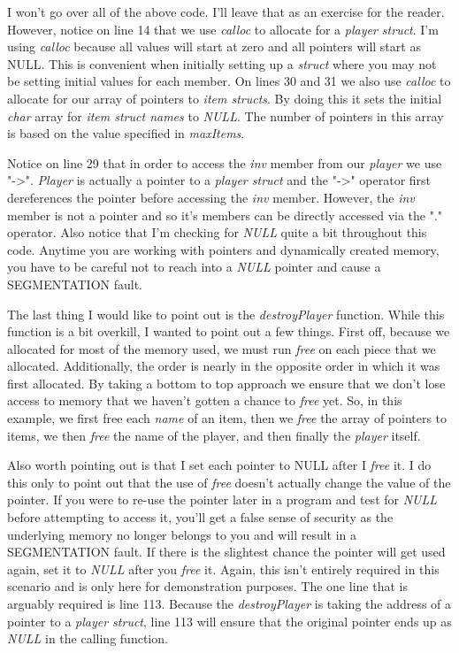 \documentclass[../main.tex]{subfiles}
\begin{document}
	
	
	I won't go over all of the above code.  I'll leave that as an exercise for the reader.  However, notice on line 14 that we use \textit{calloc} to allocate for a \textit{player struct}.  I'm using \textit{calloc} because all values will start at zero and all pointers will start as NULL.  This is convenient when initially setting up a \textit{struct} where you may not be setting initial values for each member.  On lines 30 and 31 we also use \textit{calloc} to allocate for our array of pointers to \textit{item structs}.  By doing this it sets the initial \textit{char} array for \textit{item struct names} to \textit{NULL}.  The number of pointers in this array is based on the value specified in \textit{maxItems}.
	
	Notice on line 29 that in order to access the \textit{inv} member from our \textit{player} we use "->".  \textit{Player} is actually a pointer to a \textit{player struct} and the "->" operator first dereferences the pointer before accessing the \textit{inv} member.  However, the \textit{inv} member is not a pointer and so it's members can be directly accessed via the "." operator.  Also notice that I'm checking for \textit{NULL} quite a bit throughout this code.  Anytime you are working with pointers and dynamically created memory, you have to be careful not to reach into a \textit{NULL} pointer and cause a SEGMENTATION fault.
	
	The last thing I would like to point out is the \textit{destroyPlayer} function.  While this function is a bit overkill, I wanted to point out a few things.  First off, because we allocated for most of the memory used, we must run \textit{free} on each piece that we allocated.  Additionally, the order is nearly in the opposite order in which it was first allocated.  By taking a bottom to top approach we ensure that we don't lose access to memory that we haven't gotten a chance to \textit{free} yet.  So, in this example, we first free each \textit{name} of an item, then we \textit{free} the array of pointers to items, we then \textit{free} the name of the player, and then finally the \textit{player} itself.  
	
	Also worth pointing out is that I set each pointer to NULL after I \textit{free} it.  I do this only to point out that the use of \textit{free} doesn't actually change the value of the pointer.  If you were to re-use the pointer later in a program and test for \textit{NULL} before attempting to access it, you'll get a false sense of security as the underlying memory no longer belongs to you and will result in a SEGMENTATION fault.  If there is the slightest chance the pointer will get used again, set it to \textit{NULL} after you \textit{free} it.  Again, this isn't entirely required in this scenario and is only here for demonstration purposes.  The one line that is arguably required is line 113.  Because the \textit{destroyPlayer} is taking the address of a pointer to a \textit{player struct}, line 113 will ensure that the original pointer ends up as \textit{NULL} in the calling function.\\
	
\end{document}
